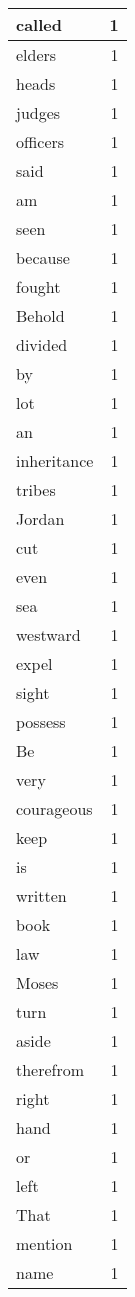 \begin{center}
\begin{longtable}{l|r}
called & 1\\ \hline 
elders & 1\\ \hline 
heads & 1\\ \hline 
judges & 1\\ \hline 
officers & 1\\ \hline 
said & 1\\ \hline 
am & 1\\ \hline 
seen & 1\\ \hline 
because & 1\\ \hline 
fought & 1\\ \hline 
Behold & 1\\ \hline 
divided & 1\\ \hline 
by & 1\\ \hline 
lot & 1\\ \hline 
an & 1\\ \hline 
inheritance & 1\\ \hline 
tribes & 1\\ \hline 
Jordan & 1\\ \hline 
cut & 1\\ \hline 
even & 1\\ \hline 
sea & 1\\ \hline 
westward & 1\\ \hline 
expel & 1\\ \hline 
sight & 1\\ \hline 
possess & 1\\ \hline 
Be & 1\\ \hline 
very & 1\\ \hline 
courageous & 1\\ \hline 
keep & 1\\ \hline 
is & 1\\ \hline 
written & 1\\ \hline 
book & 1\\ \hline 
law & 1\\ \hline 
Moses & 1\\ \hline 
turn & 1\\ \hline 
aside & 1\\ \hline 
therefrom & 1\\ \hline 
right & 1\\ \hline 
hand & 1\\ \hline 
or & 1\\ \hline 
left & 1\\ \hline 
That & 1\\ \hline 
mention & 1\\ \hline 
name & 1\\ \hline 

\end{longtable}
\end{center}

